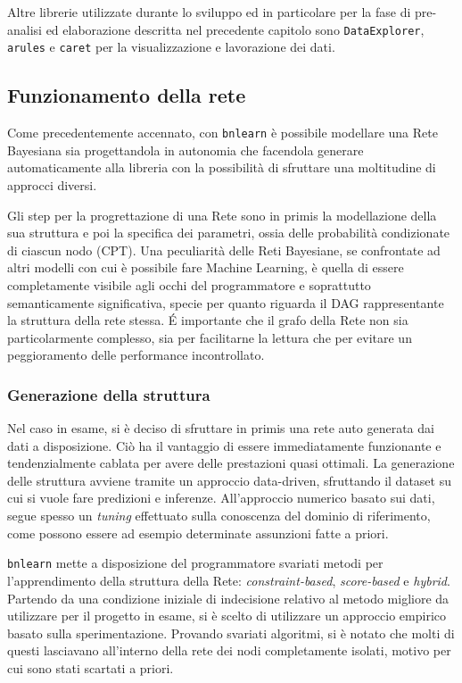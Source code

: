 \documentclass[hidelinks, 12pt]{article}
\begin{document}
\vspace{3ex}

Altre librerie utilizzate durante lo sviluppo ed in particolare per la fase di pre-analisi ed elaborazione descritta nel precedente capitolo sono \texttt{DataExplorer}, \texttt{arules} e \texttt{caret} per la visualizzazione e lavorazione dei dati.



\subsection{Funzionamento della rete}

Come precedentemente accennato, con \texttt{bnlearn} è possibile modellare una Rete Bayesiana sia progettandola in autonomia che facendola generare automaticamente alla libreria con la possibilità di sfruttare una moltitudine di approcci diversi.

Gli step per la progrettazione di una Rete sono in primis la modellazione della sua struttura e poi la specifica dei parametri, ossia delle probabilità condizionate di ciascun nodo (CPT). Una peculiarità delle Reti Bayesiane, se confrontate ad altri modelli con cui è possibile fare Machine Learning, è quella di essere completamente visibile agli occhi del programmatore e soprattutto semanticamente significativa, specie per quanto riguarda il DAG rappresentante la struttura della rete stessa. \'E importante che il grafo della Rete non sia particolarmente complesso, sia per facilitarne la lettura che per evitare un peggioramento delle performance incontrollato.


\subsubsection{Generazione della struttura}

Nel caso in esame, si è deciso di sfruttare in primis una rete auto generata dai dati a disposizione. Ciò ha il vantaggio di essere immediatamente funzionante e tendenzialmente cablata per avere delle prestazioni quasi ottimali. La generazione delle struttura avviene tramite un approccio data-driven, sfruttando il dataset su cui si vuole fare predizioni e inferenze. All'approccio numerico basato sui dati, segue spesso un \textit{tuning} effettuato sulla conoscenza del dominio di riferimento, come possono essere ad esempio determinate assunzioni fatte a priori.

\texttt{bnlearn} mette a disposizione del programmatore svariati metodi per l'apprendimento della struttura della Rete: \textit{constraint-based}, \textit{score-based} e \textit{hybrid}. Partendo da una condizione iniziale di indecisione relativo al metodo migliore da utilizzare per il progetto in esame, si è scelto di utilizzare un approccio empirico basato sulla sperimentazione. Provando svariati algoritmi, si è notato che molti di questi lasciavano all'interno della rete dei nodi completamente isolati, motivo per cui sono stati scartati a priori.
\end{document}

